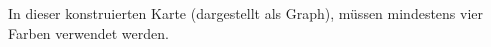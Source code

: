 \documentclass[10pt,a4paper,oneside,ngerman,numbers=noenddot]{scrartcl}
\begin{document}
			In dieser konstruierten Karte (dargestellt als Graph), müssen mindestens vier Farben verwendet werden.
\section{} %
	\subsection{} %
	\subsection{} %
	\subsection{} %
	\subsection{} %
	\subsection{} %
	\subsection{} %
\section{} %
	\subsection{} %
	\subsection{} %
	\subsection{} %
\end{document}
